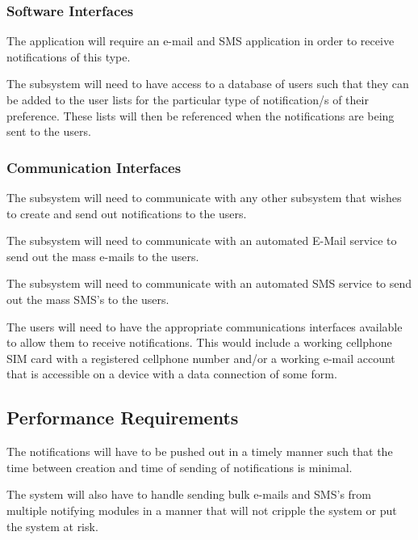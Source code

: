 \documentclass{article}
\begin{document}
	\subsubsection{Software Interfaces}
	\begin{flushleft}
	The application will require an e-mail and SMS application in order to receive notifications of this type.
\newline

	The subsystem will need to have access to a database of users such that they can be added to the user lists for the particular type of notification/s of their preference. These lists will then be referenced when the notifications are being sent to the users.
\end{flushleft}	    

	\subsubsection{Communication Interfaces}
	\begin{flushleft}
	The subsystem will need to communicate with any other subsystem that wishes to create and send out notifications to the users.
\newline

	The subsystem will need to communicate with an automated E-Mail service to send out the mass e-mails to the users.
\newline

	The subsystem will need to communicate with an automated SMS service to send out the mass SMS's to the users.
\newline

	The users will need to have the appropriate communications interfaces available to allow them to receive notifications. This would include a working cellphone SIM card with a registered cellphone number and/or a working e-mail account that is accessible on a device with a data connection of some form.
	\end{flushleft}
	
	\subsection{Performance Requirements}
    \begin{flushleft}
    The notifications will have to be pushed out in a timely manner such that the time between creation and time of sending of notifications is minimal.
    \newline
    
    The system will also have to handle sending bulk e-mails and SMS's from multiple notifying modules in a manner that will not cripple the system or put the system at risk.
    \end{flushleft}
    
\end{document}
